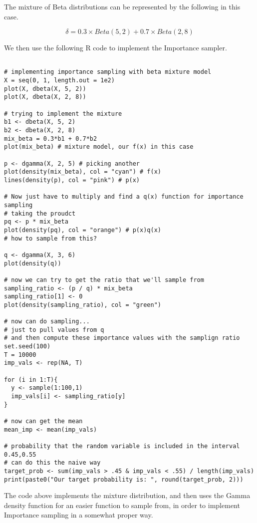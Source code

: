 \documentclass[12pt, letterpaper]{article}
\begin{document}
The mixture of Beta distributions can be represented by the following in this case. 

\begin{equation}
  \delta = 0.3 \times Beta(5, 2) + 0.7 \times Beta(2,8)
\end{equation} 

We then use the following R code to implement the Importance sampler. 

\begin{verbatim}

# implementing importance sampling with beta mixture model 
X = seq(0, 1, length.out = 1e2)
plot(X, dbeta(X, 5, 2))
plot(X, dbeta(X, 2, 8))

# trying to implement the mixture 
b1 <- dbeta(X, 5, 2)
b2 <- dbeta(X, 2, 8)
mix_beta = 0.3*b1 + 0.7*b2
plot(mix_beta) # mixture model, our f(x) in this case

p <- dgamma(X, 2, 5) # picking another
plot(density(mix_beta), col = "cyan") # f(x)
lines(density(p), col = "pink") # p(x)

# Now just have to multiply and find a q(x) function for importance sampling 
# taking the proudct 
pq <- p * mix_beta
plot(density(pq), col = "orange") # p(x)q(x)
# how to sample from this?

q <- dgamma(X, 3, 6)
plot(density(q))

# now we can try to get the ratio that we'll sample from 
sampling_ratio <- (p / q) * mix_beta
sampling_ratio[1] <- 0
plot(density(sampling_ratio), col = "green")

# now can do sampling...
# just to pull values from q 
# and then compute these importance values with the samplign ratio 
set.seed(100)
T = 10000
imp_vals <- rep(NA, T)

for (i in 1:T){
  y <- sample(1:100,1)
  imp_vals[i] <- sampling_ratio[y]
}

# now can get the mean 
mean_imp <- mean(imp_vals)

# probability that the random variable is included in the interval 0.45,0.55
# can do this the naive way 
target_prob <- sum(imp_vals > .45 & imp_vals < .55) / length(imp_vals)
print(paste0("Our target probability is: ", round(target_prob, 2)))
\end{verbatim}

The code above implements the mixture distribution, and then uses the Gamma density function for an easier function to sample from, in order to implement Importance sampling in a somewhat proper way. 
\end{document}
